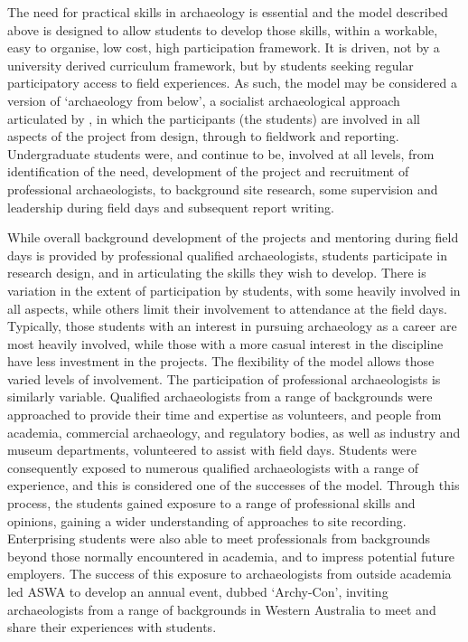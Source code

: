 \documentclass{ijsra}
\begin{document}

The need for practical skills in archaeology is essential \parencites{boytner2012}{cobb2012}{colley2012}{mytum2012a}{mytum2012b}{ulm2013} and the model described above is designed to allow students to develop those skills, within a workable, easy to organise, low cost, high participation framework. 
It is driven, not by a university derived curriculum framework, but by students seeking regular participatory access to field experiences. As such, the model may be considered a version of ‘archaeology from below’, a socialist archaeological approach articulated by \textcite{faulkner2000}, in which the participants (the students) are involved in all aspects of the project from design, through to fieldwork and reporting. 
Undergraduate students were, and continue to be, involved at all levels, from identification of the need, development of the project and recruitment of professional archaeologists, to background site research, some supervision and leadership during field days and subsequent report writing.

While overall background development of the projects and mentoring during field days is provided by professional qualified archaeologists, students participate in research design, and in articulating the skills they wish to develop. 
There is variation in the extent of participation by students, with some heavily involved in all aspects, while others limit their involvement to attendance at the field days. 
Typically, those students with an interest in pursuing archaeology as a career are most heavily involved, while those with a more casual interest in the discipline have less investment in the projects. The flexibility of the model allows those varied levels of involvement. The participation of professional archaeologists is similarly variable. 
Qualified archaeologists from a range of backgrounds were approached to provide their time and expertise as volunteers, and people from academia, commercial archaeology, and regulatory bodies, as well as industry and museum departments, volunteered to assist with field days. 
Students were consequently exposed to numerous qualified archaeologists with a range of experience, and this is considered one of the successes of the model. Through this process, the students gained exposure to a range of professional skills and opinions, gaining a wider understanding of approaches to site recording. 
Enterprising students were also able to meet professionals from backgrounds beyond those normally encountered in academia, and to impress potential future employers. 
The success of this exposure to archaeologists from outside academia led ASWA to develop an annual event, dubbed ‘Archy-Con’, inviting archaeologists from a range of backgrounds in Western Australia to meet and share their experiences with students.
\end{document}
